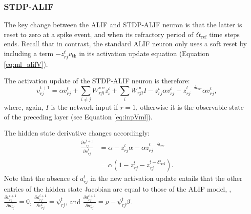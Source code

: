 		\subsubsection{STDP-ALIF}
			The key change between the ALIF and STDP-ALIF neuron is that the latter is reset to zero at a spike event, and when its refractory period of $\delta t_\text{ref}$ time steps ends.
			Recall that in contrast, the standard ALIF neuron only uses a soft reset by including a term $-z^t_{rj}v_\text{th}$ in its activation update equation (Equation \ref{eq:ml_alifV}).

			The activation update of the STDP-ALIF neuron is therefore:
			\begin{equation}\label{eq:ml_stdpalifV}
	        v^{t+1}_{rj} = \alpha v_{rj}^t + \sum_{i\neq j}W^\text{rec}_{rji}z_i^t + \sum_i W^\text{in}_{rji}I -z^t_{rj}\alpha v^t_{rj} - z_{rj}^{t-\delta t_\text{ref}}\alpha v^t_{rj},
	        \end{equation}
	        where, again, $I$ is the network input if $r=1$, otherwise it is the observable state of the preceding layer (see Equation \ref{eq:inpVml}).

	        The hidden state derivative changes accordingly:
	        \begin{align}
	        \frac{\partial v_{rj}^{t+1}}{\partial v^t_{rj}} &= \alpha - z^t_{rj}\alpha - \alpha z_{rj}^{t-\delta t_\text{ref}}\\
	        &= \alpha\left(1 - z^t_{rj} - z_{rj}^{t-\delta t_\text{ref}}\right).
	        \end{align}
	        Note that the absence of $a^t_{rj}$ in the new activation update entails that the other entries of the hidden state Jacobian are equal to those of the ALIF model, \ie, $\frac{\partial v^{t+1}_{rj}}{\partial a^t_{rj}}=0$, $\frac{\partial a^{t+1}_{rj}}{\partial v^t_{rj}}=\psi^t_{rj}$, and $\frac{\partial a^{t+1}_{rj}}{\partial a^t_{rj}} = \rho - \psi^t_{rj}\beta$.


